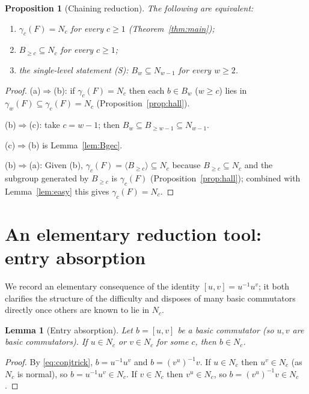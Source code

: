 \documentclass{amsart}
\newtheorem{lemma}{Lemma}
\newtheorem{proposition}{Proposition}
\theoremstyle{definition}
\theoremstyle{remark}
\begin{document}
\begin{proposition}[Chaining reduction]\label{prop:chain}
The following are equivalent:
\begin{enumerate}
\item[\textup{(a)}] $\gamma_c(F)=N_c$ for every $c\ge1$ \textup{(Theorem~\ref{thm:main})};
\item[\textup{(b)}] $B_{\ge c}\subseteq N_c$ for every $c\ge1$;
\item[\textup{(c)}] the single-level statement \textup{(S)}: $B_w\subseteq N_{w-1}$ for every $w\ge2$.
\end{enumerate}
\end{proposition}
\begin{proof}
(a)$\Rightarrow$(b): if $\gamma_c(F)=N_c$ then each $b\in B_w$ ($w\ge c$) lies in
$\gamma_w(F)\subseteq\gamma_c(F)=N_c$ (Proposition~\ref{prop:hall}).

(b)$\Rightarrow$(c): take $c=w-1$; then $B_w\subseteq B_{\ge w-1}\subseteq N_{w-1}$.

(c)$\Rightarrow$(b) is Lemma~\ref{lem:Bgec}.

(b)$\Rightarrow$(a): Given (b), $\gamma_c(F)=\langle B_{\ge c}\rangle\subseteq N_c$
because $B_{\ge c}\subseteq N_c$ and the subgroup generated by $B_{\ge c}$ is
$\gamma_c(F)$ (Proposition~\ref{prop:hall}); combined with Lemma~\ref{lem:easy}
this gives $\gamma_c(F)=N_c$.
\end{proof}

\section{An elementary reduction tool: entry absorption}\label{sec:conj}

We record an elementary consequence of the identity $[u,v]=u^{-1}u^{v}$; it both
clarifies the structure of the difficulty and disposes of many basic commutators
directly once others are known to lie in $N_c$.

\begin{lemma}[Entry absorption]\label{lem:entry}
Let $b=[u,v]$ be a basic commutator (so $u,v$ are basic commutators). If $u\in N_c$
or $v\in N_c$ for some $c$, then $b\in N_c$.
\end{lemma}
\begin{proof}
By \eqref{eq:conjtrick}, $b=u^{-1}u^{v}$ and $b=(v^{u})^{-1}v$. If $u\in N_c$ then
$u^{v}\in N_c$ (as $N_c$ is normal), so $b=u^{-1}u^{v}\in N_c$. If $v\in N_c$ then
$v^{u}\in N_c$, so $b=(v^{u})^{-1}v\in N_c$.
\end{proof}
\end{document}
